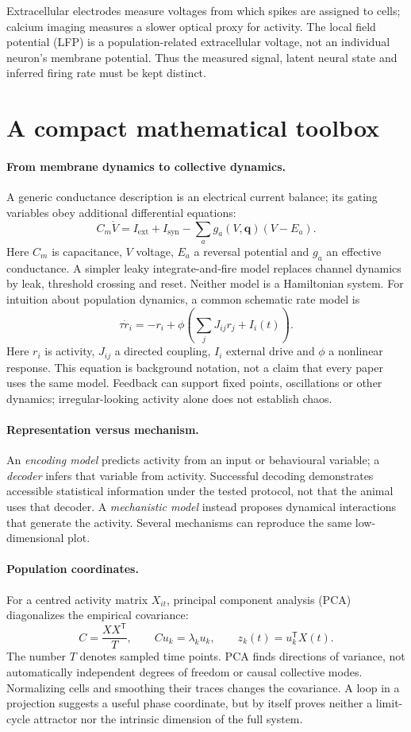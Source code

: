 \documentclass[11pt,a4paper]{article}
\begin{document}
Extracellular electrodes measure voltages from which spikes are assigned to cells; calcium imaging measures a slower optical proxy for activity. The local field potential (LFP) is a population-related extracellular voltage, not an individual neuron's membrane potential. Thus the measured signal, latent neural state and inferred firing rate must be kept distinct.

\section{A compact mathematical toolbox}
\paragraph{From membrane dynamics to collective dynamics.}
A generic conductance description is an electrical current balance; its gating variables obey additional differential equations:
\[C_m\dot V=I_{\mathrm{ext}}+I_{\mathrm{syn}}-\sum_a g_a(V,\mathbf q)(V-E_a).\]
Here $C_m$ is capacitance, $V$ voltage, $E_a$ a reversal potential and $g_a$ an effective conductance. A simpler leaky integrate-and-fire model replaces channel dynamics by leak, threshold crossing and reset. Neither model is a Hamiltonian system. For intuition about population dynamics, a common schematic rate model is
\[\tau\dot r_i=-r_i+\phi\!\left(\sum_jJ_{ij}r_j+I_i(t)\right).\]
Here $r_i$ is activity, $J_{ij}$ a directed coupling, $I_i$ external drive and $\phi$ a nonlinear response. This equation is background notation, not a claim that every paper uses the same model. Feedback can support fixed points, oscillations or other dynamics; irregular-looking activity alone does not establish chaos.

\paragraph{Representation versus mechanism.}
An \emph{encoding model} predicts activity from an input or behavioural variable; a \emph{decoder} infers that variable from activity. Successful decoding demonstrates accessible statistical information under the tested protocol, not that the animal uses that decoder. A \emph{mechanistic model} instead proposes dynamical interactions that generate the activity. Several mechanisms can reproduce the same low-dimensional plot.

\paragraph{Population coordinates.}
For a centred activity matrix $X_{it}$, principal component analysis (PCA) diagonalizes the empirical covariance:
\[C=\frac{XX^\mathsf T}{T},\qquad Cu_k=\lambda_ku_k,\qquad z_k(t)=u_k^\mathsf TX(t).\]
The number $T$ denotes sampled time points. PCA finds directions of variance, not automatically independent degrees of freedom or causal collective modes. Normalizing cells and smoothing their traces changes the covariance. A loop in a projection suggests a useful phase coordinate, but by itself proves neither a limit-cycle attractor nor the intrinsic dimension of the full system.
\end{document}
